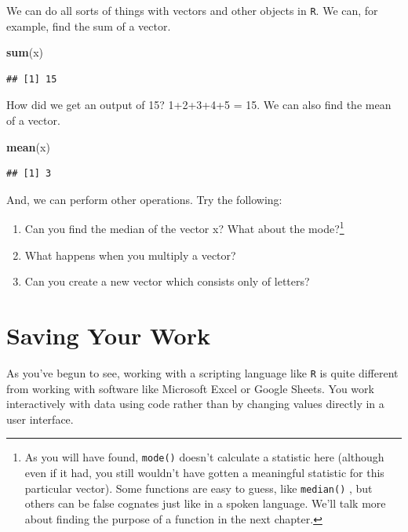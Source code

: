 \documentclass[
]{book}
\newenvironment{Shaded}{\begin{snugshade}}{\end{snugshade}}
\newcommand{\FunctionTok}[1]{\textcolor[rgb]{0.13,0.29,0.53}{\textbf{#1}}}
\newcommand{\NormalTok}[1]{#1}
\begin{document}
We can do all sorts of things with vectors and other objects in \texttt{R}. We can, for example, find the sum of a vector.

\begin{Shaded}
\begin{Highlighting}[]
\FunctionTok{sum}\NormalTok{(x)}
\end{Highlighting}
\end{Shaded}

\begin{verbatim}
## [1] 15
\end{verbatim}

How did we get an output of 15? 1+2+3+4+5 = 15. We can also find the mean of a vector.

\begin{Shaded}
\begin{Highlighting}[]
\FunctionTok{mean}\NormalTok{(x)}
\end{Highlighting}
\end{Shaded}

\begin{verbatim}
## [1] 3
\end{verbatim}

And, we can perform other operations. Try the following:

\begin{enumerate}
\def\labelenumi{\arabic{enumi}.}
\item
  Can you find the median of the vector x? What about the mode?\footnote{As you will have found, \texttt{mode()} doesn't calculate a statistic here (although even if it had, you still wouldn't have gotten a meaningful statistic for this particular vector). Some functions are easy to guess, like \texttt{median()} , but others can be false cognates just like in a spoken language. We'll talk more about finding the purpose of a function in the next chapter.}
\item
  What happens when you multiply a vector?
\item
  Can you create a new vector which consists only of letters?
\end{enumerate}

\hypertarget{saving-your-work}{%
\section{Saving Your Work}\label{saving-your-work}}

As you've begun to see, working with a scripting language like \texttt{R} is quite different from working with software like Microsoft Excel or Google Sheets. You work interactively with data using code rather than by changing values directly in a user interface.
\end{document}
